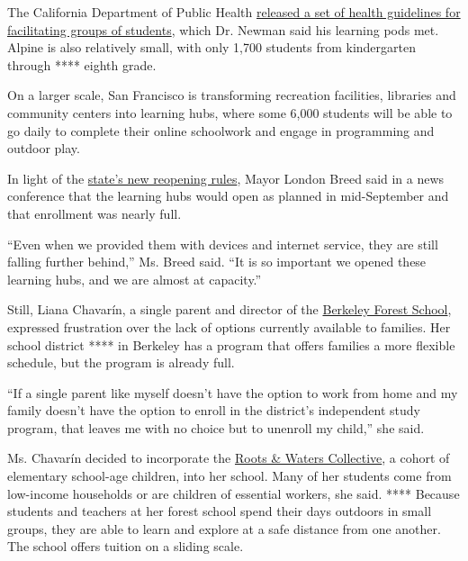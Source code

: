 The California Department of Public Health
\href{https://www.cdph.ca.gov/Programs/CID/DCDC/Pages/COVID-19/small-groups-child-youth.aspx}{released
a set of health guidelines for facilitating groups of students}, which
Dr. Newman said his learning pods met. Alpine is also relatively small,
with only 1,700 students from kindergarten through **** eighth grade.

On a larger scale, San Francisco is transforming recreation facilities,
libraries and community centers into learning hubs, where some 6,000
students will be able to go daily to complete their online schoolwork
and engage in programming and outdoor play.

In light of the
\href{https://messaging-custom-newsletters.nytimes3xbfgragh.onion/template/oakv2?campaign_id=49\&emc=edit_ca_20200831\&instance_id=21774\&nl=california-today\&productCode=CA\&regi_id=68519573\&segment_id=37216\&te=1\&uri=nyt\%3A\%2F\%2Fnewsletter\%2Fef87c1d8-ddb3-57ab-8f46-f3d9b9d9b92c\&user_id=ac4ca2966d3316b2e2f6ffbb6a584192}{state's
new reopening rules}, Mayor London Breed said in a news conference that
the learning hubs would open as planned in mid-September and that
enrollment was nearly full.

``Even when we provided them with devices and internet service, they are
still falling further behind,'' Ms. Breed said. ``It is so important we
opened these learning hubs, and we are almost at capacity.''

Still, Liana Chavarín, a single parent and director of the
\href{http://berkeleyforestschool.org}{Berkeley Forest School},
expressed frustration over the lack of options currently available to
families. Her school district **** in Berkeley has a program that offers
families a more flexible schedule, but the program is already full.

``If a single parent like myself doesn't have the option to work from
home and my family doesn't have the option to enroll in the district's
independent study program, that leaves me with no choice but to unenroll
my child,'' she said.

Ms. Chavarín decided to incorporate the
\href{http://www.berkeleyforestschool.org/roots-and-waters-collective}{Roots
\& Waters Collective}, a cohort of elementary school-age children, into
her school. Many of her students come from low-income households or are
children of essential workers, she said. **** Because students and
teachers at her forest school spend their days outdoors in small groups,
they are able to learn and explore at a safe distance from one another.
The school offers tuition on a sliding scale.

